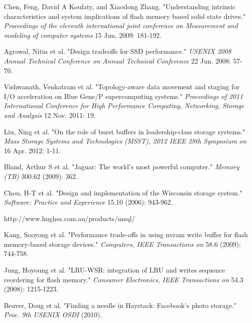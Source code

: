 \documentclass[letterpaper, 10pt]{article}
\begin{document}
\begin{small}
\begin{footnotesize}

\begin{thebibliography}{}


Chen, Feng, David A Koufaty, and Xiaodong Zhang. "Understanding intrinsic
characteristics and system implications of flash memory based solid state
drives."
{\it Proceedings of the eleventh international joint conference on
Measurement and modeling of computer systems} 15 Jun. 2009: 181-192.

Agrawal, Nitin et al. "Design tradeoffs for SSD performance."
{\it USENIX 2008 Annual Technical Conference on Annual Technical Conference}
22 Jun. 2008: 57-70.

Vishwanath, Venkatram et al. "Topology-aware data movement and staging for I/O
acceleration on Blue Gene/P supercomputing systems."
{\it Proceedings of 2011
International Conference for High Performance Computing, Networking, Storage
and Analysis} 12 Nov. 2011: 19.

Liu, Ning et al. "On the role of burst buffers in leadership-class storage
systems."
{\it Mass Storage Systems and Technologies (MSST), 2012 IEEE 28th
Symposium on} 16 Apr. 2012: 1-11.

Bland, Arthur S et al. "Jaguar: The world’s most powerful computer."
{\it Memory (TB)} 300.62 (2009): 362.

Chou, H‐T et al. "Design and implementation of the Wisconsin storage system."
{\it Software: Practice and Experience} 15.10 (2006): 943-962.

http://www.hughes.com.au/products/msql/

Kang, Sooyong et al. "Performance trade-offs in using nvram write buffer for
flash memory-based storage devices."
{\it Computers, IEEE Transactions on} 58.6
(2009): 744-758.

Jung, Hoyoung et al. "LRU-WSR: integration of LRU and writes sequence
reordering for flash memory."
{\it Consumer Electronics, IEEE Transactions on} 54.3
(2008): 1215-1223.

Beaver, Doug et al. "Finding a needle in Haystack: Facebook’s photo storage."
{\it Proc. 9th USENIX OSDI} (2010).


\end{thebibliography}
\end{footnotesize}
\end{small}
\end{document}
